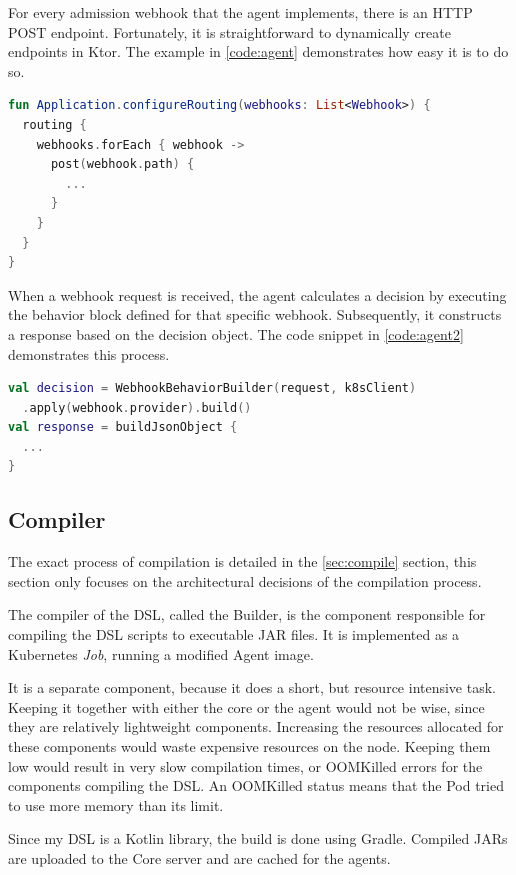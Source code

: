 For every admission webhook that the agent implements, there is an HTTP POST endpoint. Fortunately, it is straightforward to dynamically create endpoints in Ktor. The example in \ref{code:agent} demonstrates how easy it is to do so.

\begin{lstlisting}[caption={Dynamically create endpoints},language=Kotlin,label=code:agent]
fun Application.configureRouting(webhooks: List<Webhook>) {
  routing {
    webhooks.forEach { webhook ->
      post(webhook.path) {
        ...
      }
    }
  }
}
\end{lstlisting}

When a webhook request is received, the agent calculates a decision by executing the behavior block defined for that specific webhook. Subsequently, it constructs a response based on the decision object. The code snippet in \ref{code:agent2} demonstrates this process.

\begin{lstlisting}[caption={Make webhook decision},language=Kotlin,label=code:agent2]
val decision = WebhookBehaviorBuilder(request, k8sClient)
  .apply(webhook.provider).build()
val response = buildJsonObject {
  ...
}
\end{lstlisting}

\subsection{Compiler}

The exact process of compilation is detailed in the \ref{sec:compile} section, this section only focuses on the architectural decisions of the compilation process.

The compiler of the DSL, called the Builder, is the component responsible for compiling the DSL scripts to executable JAR files. It is implemented as a Kubernetes \emph{Job}, running a modified Agent image.

It is a separate component, because it does a short, but resource intensive task. Keeping it together with either the core or the agent would not be wise, since they are relatively lightweight components. Increasing the resources allocated for these components would waste expensive resources on the node. Keeping them low would result in very slow compilation times, or OOMKilled errors for the components compiling the DSL. An OOMKilled status means that the Pod tried to use more memory than its limit.

Since my DSL is a Kotlin library, the build is done using Gradle. Compiled JARs are uploaded to the Core server and are cached for the agents.

